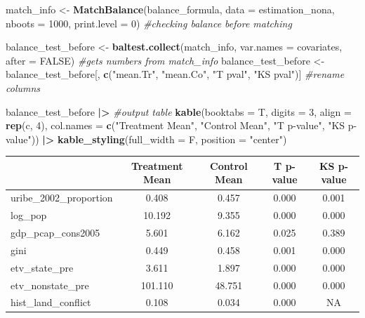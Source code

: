 \documentclass[
]{article}
\newenvironment{Shaded}{\begin{snugshade}}{\end{snugshade}}
\newcommand{\AttributeTok}[1]{\textcolor[rgb]{0.13,0.29,0.53}{#1}}
\newcommand{\CommentTok}[1]{\textcolor[rgb]{0.56,0.35,0.01}{\textit{#1}}}
\newcommand{\ConstantTok}[1]{\textcolor[rgb]{0.56,0.35,0.01}{#1}}
\newcommand{\DecValTok}[1]{\textcolor[rgb]{0.00,0.00,0.81}{#1}}
\newcommand{\FunctionTok}[1]{\textcolor[rgb]{0.13,0.29,0.53}{\textbf{#1}}}
\newcommand{\NormalTok}[1]{#1}
\newcommand{\OtherTok}[1]{\textcolor[rgb]{0.56,0.35,0.01}{#1}}
\newcommand{\SpecialCharTok}[1]{\textcolor[rgb]{0.81,0.36,0.00}{\textbf{#1}}}
\newcommand{\StringTok}[1]{\textcolor[rgb]{0.31,0.60,0.02}{#1}}
\begin{document}
\begin{Shaded}
\begin{Highlighting}[]
\NormalTok{match\_info }\OtherTok{\textless{}{-}} \FunctionTok{MatchBalance}\NormalTok{(balance\_formula, }\AttributeTok{data =}\NormalTok{ estimation\_nona, }\AttributeTok{nboots =} \DecValTok{1000}\NormalTok{, }\AttributeTok{print.level =} \DecValTok{0}\NormalTok{) }\CommentTok{\#checking balance before matching}

\NormalTok{balance\_test\_before }\OtherTok{\textless{}{-}} \FunctionTok{baltest.collect}\NormalTok{(match\_info, }\AttributeTok{var.names =}\NormalTok{ covariates, }\AttributeTok{after =} \ConstantTok{FALSE}\NormalTok{) }\CommentTok{\#gets numbers from match\_info}
\NormalTok{balance\_test\_before }\OtherTok{\textless{}{-}}\NormalTok{ balance\_test\_before[, }\FunctionTok{c}\NormalTok{(}\StringTok{"mean.Tr"}\NormalTok{, }\StringTok{"mean.Co"}\NormalTok{, }\StringTok{"T pval"}\NormalTok{, }\StringTok{"KS pval"}\NormalTok{)] }\CommentTok{\#rename columns}

\NormalTok{balance\_test\_before }\SpecialCharTok{|\textgreater{}} \CommentTok{\#output table}
  \FunctionTok{kable}\NormalTok{(}\AttributeTok{booktabs =}\NormalTok{ T, }\AttributeTok{digits =} \DecValTok{3}\NormalTok{, }\AttributeTok{align =} \FunctionTok{rep}\NormalTok{(}\StringTok{\textquotesingle{}c\textquotesingle{}}\NormalTok{, }\DecValTok{4}\NormalTok{),}
        \AttributeTok{col.names =} \FunctionTok{c}\NormalTok{(}\StringTok{"Treatment Mean"}\NormalTok{, }\StringTok{"Control Mean"}\NormalTok{, }\StringTok{"T p{-}value"}\NormalTok{, }\StringTok{"KS p{-}value"}\NormalTok{)) }\SpecialCharTok{|\textgreater{}}
  \FunctionTok{kable\_styling}\NormalTok{(}\AttributeTok{full\_width =}\NormalTok{ F, }\AttributeTok{position =} \StringTok{"center"}\NormalTok{)}
\end{Highlighting}
\end{Shaded}

\begin{longtable}[t]{lcccc}
\toprule
 & Treatment Mean & Control Mean & T p-value & KS p-value\\
\midrule
uribe\_2002\_proportion & 0.408 & 0.457 & 0.000 & 0.001\\
log\_pop & 10.192 & 9.355 & 0.000 & 0.000\\
gdp\_pcap\_cons2005 & 5.601 & 6.162 & 0.025 & 0.389\\
gini & 0.449 & 0.458 & 0.001 & 0.000\\
etv\_state\_pre & 3.611 & 1.897 & 0.000 & 0.000\\
\addlinespace
etv\_nonstate\_pre & 101.110 & 48.751 & 0.000 & 0.000\\
hist\_land\_conflict & 0.108 & 0.034 & 0.000 & NA\\
\bottomrule
\end{longtable}
\end{document}
